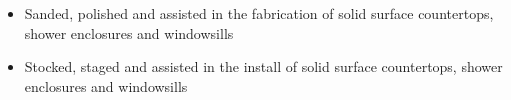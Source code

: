\begin{itemize}
  \item Sanded, polished and assisted in the fabrication of solid surface
    countertops, shower enclosures and windowsills
  \item Stocked, staged and assisted in the install of solid surface
    countertops, shower enclosures and windowsills
\end{itemize}
